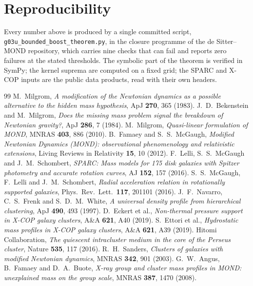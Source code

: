 \documentclass[11pt,letterpaper]{article}
\begin{document}
\section{Reproducibility}
Every number above is produced by a single committed script, \texttt{g03u\_bounded\_boost\_theorem.py}, in the closure programme of the de Sitter--MOND repository, which carries nine checks that can fail and reports zero failures at the stated thresholds. The symbolic part of the theorem is verified in SymPy; the kernel suprema are computed on a fixed grid; the SPARC and X-COP inputs are the public data products, read with their own headers.
\begin{thebibliography}{99}
 M.\ Milgrom, \emph{A modification of the Newtonian dynamics as a possible alternative to the hidden mass hypothesis}, ApJ \textbf{270}, 365 (1983).
 J.\ D.\ Bekenstein and M.\ Milgrom, \emph{Does the missing mass problem signal the breakdown of Newtonian gravity?}, ApJ \textbf{286}, 7 (1984).
 M.\ Milgrom, \emph{Quasi-linear formulation of MOND}, MNRAS \textbf{403}, 886 (2010).
 B.\ Famaey and S.\ S.\ McGaugh, \emph{Modified Newtonian Dynamics (MOND): observational phenomenology and relativistic extensions}, Living Reviews in Relativity \textbf{15}, 10 (2012).
 F.\ Lelli, S.\ S.\ McGaugh and J.\ M.\ Schombert, \emph{SPARC: Mass models for 175 disk galaxies with Spitzer photometry and accurate rotation curves}, AJ \textbf{152}, 157 (2016).
 S.\ S.\ McGaugh, F.\ Lelli and J.\ M.\ Schombert, \emph{Radial acceleration relation in rotationally supported galaxies}, Phys.\ Rev.\ Lett.\ \textbf{117}, 201101 (2016).
 J.\ F.\ Navarro, C.\ S.\ Frenk and S.\ D.\ M.\ White, \emph{A universal density profile from hierarchical clustering}, ApJ \textbf{490}, 493 (1997).
 D.\ Eckert et al., \emph{Non-thermal pressure support in X-COP galaxy clusters}, A\&A \textbf{621}, A40 (2019).
 S.\ Ettori et al., \emph{Hydrostatic mass profiles in X-COP galaxy clusters}, A\&A \textbf{621}, A39 (2019).
 Hitomi Collaboration, \emph{The quiescent intracluster medium in the core of the Perseus cluster}, Nature \textbf{535}, 117 (2016).
 R.\ H.\ Sanders, \emph{Clusters of galaxies with modified Newtonian dynamics}, MNRAS \textbf{342}, 901 (2003).
 G.\ W.\ Angus, B.\ Famaey and D.\ A.\ Buote, \emph{X-ray group and cluster mass profiles in MOND: unexplained mass on the group scale}, MNRAS \textbf{387}, 1470 (2008).

\end{thebibliography}
\end{document}
